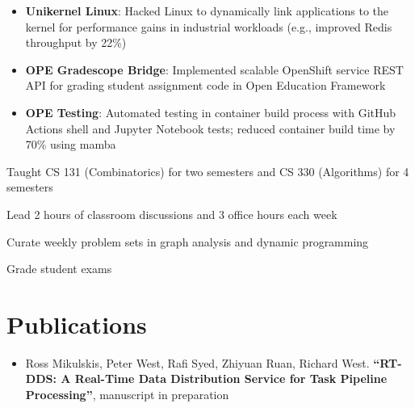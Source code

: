 \documentclass[10pt]{article}
\begin{document}
\begin{FlushLeft}
\begin{itemize}
\item \textbf{Unikernel Linux}: Hacked Linux to dynamically link applications to the kernel for performance gains in industrial workloads (e.g., improved Redis throughput by 22\%)
\item \textbf{OPE Gradescope Bridge}: Implemented scalable OpenShift service REST API for grading student assignment code in Open Education Framework
\item \textbf{OPE Testing}: Automated testing in container build process with GitHub Actions shell and Jupyter Notebook tests; reduced container build time by 70\% using mamba
\end{itemize}

  \begin{itemize}{
    \item Taught CS 131 (Combinatorics) for two semesters and CS 330 (Algorithms) for 4 semesters
    \item Lead 2 hours of classroom discussions and 3 office hours each week
    \item Curate weekly problem sets in graph analysis and dynamic programming
    \item Grade student exams
    }
  \end{itemize}

  \section{Publications}
  \begin{itemize}
  \item Ross Mikulskis, Peter West, Rafi Syed, Zhiyuan Ruan, Richard West. \textbf{``RT-DDS: A Real-Time Data Distribution Service for Task Pipeline Processing''},
manuscript in preparation    
  \end{itemize}

\end{FlushLeft}
\end{document}
